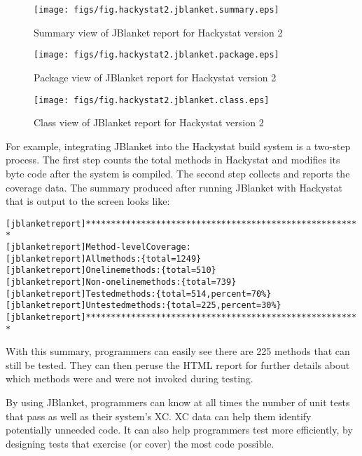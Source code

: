 \begin{figure}[htbp]
  \centering
  \texttt{[image: figs/fig.hackystat2.jblanket.summary.eps]}
  \caption{Summary view of JBlanket report for Hackystat version 2}
  \label{fig:hackystat2.jblanket.summary}
\end{figure}

\begin{figure}[htbp]
  \centering
  \texttt{[image: figs/fig.hackystat2.jblanket.package.eps]}
  \caption{Package view of JBlanket report for Hackystat version 2}
  \label{fig:hackystat2.jblanket.package}
\end{figure}

\begin{figure}[htbp]
  \centering
  \texttt{[image: figs/fig.hackystat2.jblanket.class.eps]}
  \caption{Class view of JBlanket report for Hackystat version 2}
  \label{fig:hackystat2.jblanket.class}
\end{figure}

For example, integrating JBlanket into the Hackystat build system is a
two-step process.  The first step counts the total methods in Hackystat and
modifies its byte code after the system is compiled.  The second step
collects and reports the coverage data.  The summary produced after running
JBlanket with Hackystat that is output to the screen looks like:

\begin{alltt}
{\small{}[jblanketreport] *******************************************************
[jblanketreport] Method-level Coverage:
[jblanketreport] All methods: \{total=1249\}
[jblanketreport] One line methods: \{total=510\}
[jblanketreport] Non-one line methods: \{total=739\}
[jblanketreport] Tested methods: \{total=514, percent=70\%\}
[jblanketreport] Untested methods: \{total=225,  percent=30\%\}
[jblanketreport] *******************************************************
}
\end{alltt}
With this summary, programmers can easily see there are 225 methods that
can still be tested.  They can then peruse the HTML report for further
details about which methods were and were not invoked during testing.

By using JBlanket, programmers can know at all times the number of unit
tests that pass as well as their system's XC.  XC data can help them
identify potentially unneeded code.  It can also help programmers test more
efficiently, by designing tests that exercise (or cover) the most code
possible.

